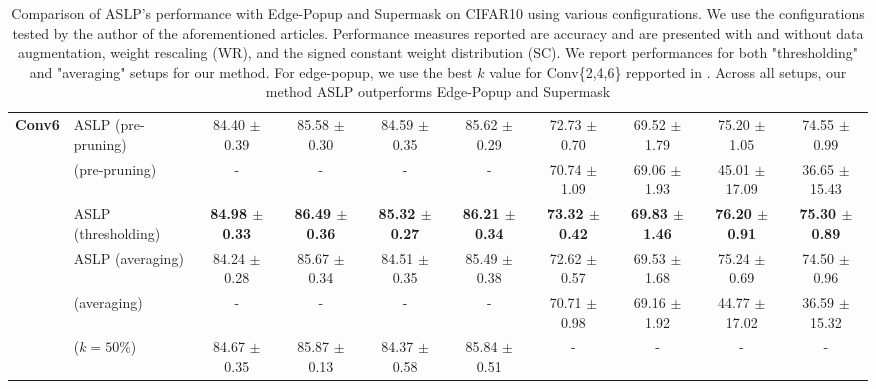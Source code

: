 \begin{table}
{\begin{tabular}{llcccccccc}
       \multirow{6}{*}{\textbf{Conv6}} & ASLP (pre-pruning) & 84.40 $\pm$ 0.39 & 85.58 $\pm$ 0.30 & 84.59 $\pm$ 0.35 & 85.62 $\pm$ 0.29 & 72.73 $\pm$ 0.70 & 69.52 $\pm$ 1.79 & 75.20 $\pm$ 1.05 & 74.55 $\pm$ 0.99 \\
        & \cite{DBLP:conf/nips/ZhouLLY19} (pre-pruning) & - & - & - & - & 70.74 $\pm$ 1.09 & 69.06 $\pm$ 1.93 & 45.01 $\pm$ 17.09 & 36.65 $\pm$ 15.43 \\
      \cmidrule(lr){2-10}
        & ASLP (thresholding) & \textbf{84.98 $\pm$ 0.33} & \textbf{86.49 $\pm$ 0.36} & \textbf{85.32 $\pm$ 0.27} & \textbf{86.21 $\pm$ 0.34} & \textbf{73.32 $\pm$ 0.42} & \textbf{69.83 $\pm$ 1.46} & \textbf{76.20 $\pm$ 0.91} & \textbf{75.30 $\pm$ 0.89} \\
        & ASLP (averaging)& 84.24 $\pm$ 0.28 & 85.67 $\pm$ 0.34 & 84.51 $\pm$ 0.35 & 85.49 $\pm$ 0.38 & 72.62 $\pm$ 0.57 & 69.53 $\pm$ 1.68 & 75.24 $\pm$ 0.69 & 74.50 $\pm$ 0.96 \\
        & \cite{DBLP:conf/nips/ZhouLLY19} (averaging) & - & - & - & - & 70.71 $\pm$ 0.98 & 69.16 $\pm$ 1.92 & 44.77 $\pm$ 17.02 & 36.59 $\pm$ 15.32 \\
        & \cite{DBLP:conf/cvpr/RamanujanWKFR20} ($k=50\%$) & 84.67 $\pm$ 0.35 & 85.87 $\pm$ 0.13 & 84.37 $\pm$ 0.58 & 85.84 $\pm$ 0.51 & - & - & - & - \\
      \bottomrule
    \end{tabular}
  }
  \caption{Comparison of ASLP's performance with Edge-Popup and Supermask
  \cite{DBLP:conf/cvpr/RamanujanWKFR20,DBLP:conf/nips/ZhouLLY19} on CIFAR10
  using various configurations. We use the configurations tested by the author
  of the aforementioned articles. Performance measures reported are accuracy and
  are presented with and without data augmentation, weight rescaling (WR), and
  the signed constant weight distribution (SC). We report performances for both
  "thresholding" and "averaging" setups for our method. For edge-popup, we use
  the best $k$ value for Conv\{2,4,6\} repported in
  \cite{DBLP:conf/cvpr/RamanujanWKFR20}.  Across all setups, our method ASLP
  outperforms Edge-Popup and Supermask}
  \label{tab:chap2:con_performances_comparison_cifar10}
  
\end{table}



